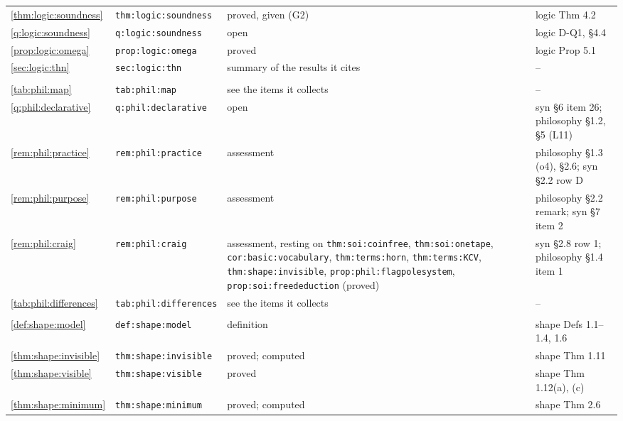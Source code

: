 {\begin{longtable}{@{}>{\raggedright\arraybackslash}p{}>{\raggedright\arraybackslash}p{}>{\raggedright\arraybackslash}p{}>{\raggedright\arraybackslash}p{}@{}}
\cref{thm:logic:soundness} & \texttt{thm:\allowbreak logic:\allowbreak soundness} & proved, given (G2) & logic Thm 4.2\\
\cref{q:logic:soundness} & \texttt{q:\allowbreak logic:\allowbreak soundness} & open & logic D-Q1, \S4.4\\
\cref{prop:logic:omega} & \texttt{prop:\allowbreak logic:\allowbreak omega} & proved & logic Prop 5.1\\
\cref{sec:logic:thn} & \texttt{sec:\allowbreak logic:\allowbreak thn} & summary of the results it cites & --\\
\midrule
\multicolumn{4}{@{}l}{\texttt{phil.tex}}\\
\cref{tab:phil:map} & \texttt{tab:\allowbreak phil:\allowbreak map} & see the items it collects & --\\
\cref{q:phil:declarative} & \texttt{q:\allowbreak phil:\allowbreak declarative} & open & syn §6 item 26; philosophy §1.2, §5 (L11)\\
\cref{rem:phil:practice} & \texttt{rem:\allowbreak phil:\allowbreak practice} & assessment & philosophy §1.3 (o4), §2.6; syn §2.2 row D\\
\cref{rem:phil:purpose} & \texttt{rem:\allowbreak phil:\allowbreak purpose} & assessment & philosophy §2.2 remark; syn §7 item 2\\
\cref{rem:phil:craig} & \texttt{rem:\allowbreak phil:\allowbreak craig} & assessment, resting on \texttt{thm:soi:coinfree}, \texttt{thm:soi:onetape}, \texttt{cor:basic:vocabulary}, \texttt{thm:terms:horn}, \texttt{thm:terms:KCV}, \texttt{thm:shape:invisible}, \texttt{prop:phil:flagpolesystem}, \texttt{prop:soi:freededuction} (proved) & syn §2.8 row 1; philosophy §1.4 item 1\\
\cref{tab:phil:differences} & \texttt{tab:\allowbreak phil:\allowbreak differences} & see the items it collects & --\\
\midrule
\multicolumn{4}{@{}l}{\texttt{shape.tex}}\\
\cref{def:shape:model} & \texttt{def:\allowbreak shape:\allowbreak model} & definition & shape Defs 1.1--1.4, 1.6\\
\cref{thm:shape:invisible} & \texttt{thm:\allowbreak shape:\allowbreak invisible} & proved; computed & shape Thm 1.11\\
\cref{thm:shape:visible} & \texttt{thm:\allowbreak shape:\allowbreak visible} & proved & shape Thm 1.12(a), (c)\\
\cref{thm:shape:minimum} & \texttt{thm:\allowbreak shape:\allowbreak minimum} & proved; computed & shape Thm 2.6\\

\end{longtable}}

